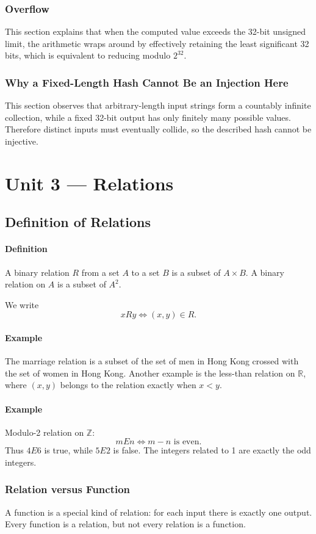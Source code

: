 \documentclass[12pt]{article}
\newcommand{\Definition}{\paragraph{Definition}}
\newcommand{\Example}{\paragraph{Example}}
\begin{document}
\subsubsection{Overflow}
This section explains that when the computed value exceeds the 32-bit unsigned limit, the arithmetic wraps around by effectively retaining the least significant 32 bits, which is equivalent to reducing modulo $2^{32}$.

\subsubsection{Why a Fixed-Length Hash Cannot Be an Injection Here}
This section observes that arbitrary-length input strings form a countably infinite collection, while a fixed 32-bit output has only finitely many possible values. Therefore distinct inputs must eventually collide, so the described hash cannot be injective.

\newpage
\section{Unit 3 --- Relations}

\subsection{Definition of Relations}
\Definition A binary relation $R$ from a set $A$ to a set $B$ is a subset of $A\times B$. A binary relation on $A$ is a subset of $A^2$.

We write
\[
xRy\iff(x,y)\in R.
\]

\Example The marriage relation is a subset of the set of men in Hong Kong crossed with the set of women in Hong Kong. Another example is the less-than relation on $\mathbb R$, where $(x,y)$ belongs to the relation exactly when $x<y$.

\Example Modulo-2 relation on $\mathbb Z$:
\[
mEn\iff m-n\text{ is even}.
\]
Thus $4E6$ is true, while $5E2$ is false. The integers related to 1 are exactly the odd integers.

\subsubsection{Relation versus Function}
A function is a special kind of relation: for each input there is exactly one output. Every function is a relation, but not every relation is a function.
\end{document}
